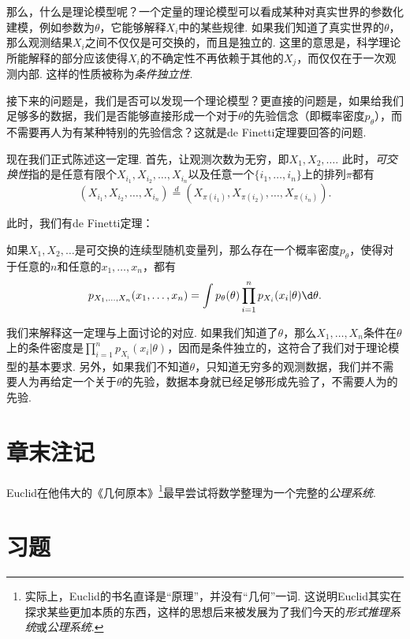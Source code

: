 那么，什么是理论模型呢？一个定量的理论模型可以看成某种对真实世界的参数化建模，例如参数为$\theta$，它能够解释$X_i$中的某些规律. 如果我们知道了真实世界的$\theta$，那么观测结果$X_i$之间不仅仅是可交换的，而且是独立的. 这里的意思是，科学理论所能解释的部分应该使得$X_i$的不确定性不再依赖于其他的$X_j$，而仅仅在于一次观测内部. 这样的性质被称为\emph{条件独立性}. 

接下来的问题是，我们是否可以发现一个理论模型？更直接的问题是，如果给我们足够多的数据，我们是否能够直接形成一个对于$\theta$的先验信念（即概率密度$p_\theta$），而不需要再人为有某种特别的先验信念？这就是de Finetti定理要回答的问题.

现在我们正式陈述这一定理. 首先，让观测次数为无穷，即$X_1,X_2,\dots$. 此时，\emph{可交换性}指的是任意有限个$X_{i_1},X_{i_2},\dots,X_{i_n}$以及任意一个$\{i_1,\dots,i_n\}$上的排列$\pi$都有
\[
    (X_{i_1},X_{i_2},\dots,X_{i_n})\stackrel{d}{=}(X_{\pi(i_1)},X_{\pi(i_2)},\dots,X_{\pi(i_n)}).
\]

此时，我们有de Finetti定理：

\begin{theorem}[de Finetti定理]
    如果$X_1,X_2,\dots$是可交换的连续型随机变量列，那么存在一个概率密度$p_\theta$，使得对于任意的$n$和任意的$x_1,\dots,x_n$，都有
    \[
        p_{X_1,\dots,X_n}(x_1,\dots,x_n) = \int p_\theta(\theta)\prod_{i=1}^n p_{X_i}(x_i|\theta)\d\theta.
    \]
\end{theorem}

我们来解释这一定理与上面讨论的对应. 如果我们知道了$\theta$，那么$X_1,\dots,X_n$条件在$\theta$上的条件密度是$\prod_{i=1}^n p_{X_i}(x_i|\theta)$，因而是条件独立的，这符合了我们对于理论模型的基本要求. 另外，如果我们不知道$\theta$，只知道无穷多的观测数据，我们并不需要人为再给定一个关于$\theta$的先验，数据本身就已经足够形成先验了，不需要人为的先验. 

\section{章末注记} 

Euclid在他伟大的《几何原本》\footnote{实际上，Euclid的书名直译是“原理”，并没有“几何”一词. 这说明Euclid其实在探求某些更加本质的东西，这样的思想后来被发展为了我们今天的\emph{形式推理系统}或\emph{公理系统}.}最早尝试将数学整理为一个完整的\emph{公理系统}. 

\section{习题} 